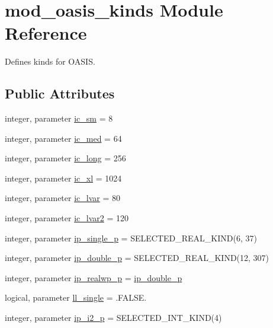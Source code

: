 \hypertarget{classmod__oasis__kinds}{\section{mod\+\_\+oasis\+\_\+kinds Module Reference}
\label{classmod__oasis__kinds}
}


Defines kinds for O\+A\+S\+I\+S.  


\subsection*{Public Attributes}
\begin{DoxyCompactItemize}
\item 
integer, parameter \hyperlink{classmod__oasis__kinds_a1a914199db5381b8d08453c7cb468a71}{ic\+\_\+sm} = 8
\item 
integer, parameter \hyperlink{classmod__oasis__kinds_a152059eec479887a8347b0f21d30d600}{ic\+\_\+med} = 64
\item 
integer, parameter \hyperlink{classmod__oasis__kinds_ada2568a43f71f0f93c054cfd3982da57}{ic\+\_\+long} = 256
\item 
integer, parameter \hyperlink{classmod__oasis__kinds_a8da8fcfc62bc8c67614f998f57e7e3fc}{ic\+\_\+xl} = 1024
\item 
integer, parameter \hyperlink{classmod__oasis__kinds_a5c0c2841fb9b4f7cbeb6de3f5731371a}{ic\+\_\+lvar} = 80
\item 
integer, parameter \hyperlink{classmod__oasis__kinds_abeab7014394cb77b89575d5d93e5f637}{ic\+\_\+lvar2} = 120
\item 
integer, parameter \hyperlink{classmod__oasis__kinds_a298ab0c96a80ba12ba8969e6bcd186ed}{ip\+\_\+single\+\_\+p} = S\+E\+L\+E\+C\+T\+E\+D\+\_\+\+R\+E\+A\+L\+\_\+\+K\+I\+N\+D(6, 37)
\item 
integer, parameter \hyperlink{classmod__oasis__kinds_aff0b6e4604e7a60178eeca47edec1460}{ip\+\_\+double\+\_\+p} = S\+E\+L\+E\+C\+T\+E\+D\+\_\+\+R\+E\+A\+L\+\_\+\+K\+I\+N\+D(12, 307)
\item 
integer, parameter \hyperlink{classmod__oasis__kinds_a3875d67b4b579bb15696c55b5547d3c4}{ip\+\_\+realwp\+\_\+p} = \hyperlink{classmod__oasis__kinds_aff0b6e4604e7a60178eeca47edec1460}{ip\+\_\+double\+\_\+p}
\item 
logical, parameter \hyperlink{classmod__oasis__kinds_ae462c851305d5fe6ef6178c9dcac4468}{ll\+\_\+single} = .F\+A\+L\+S\+E.
\item 
integer, parameter \hyperlink{classmod__oasis__kinds_a27d396cfa521ce47479118dee466eb3c}{ip\+\_\+i2\+\_\+p} = S\+E\+L\+E\+C\+T\+E\+D\+\_\+\+I\+N\+T\+\_\+\+K\+I\+N\+D(4)

\end{DoxyCompactItemize}
